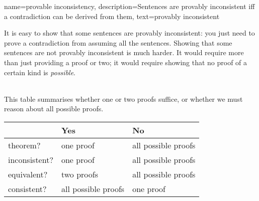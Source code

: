 {    name={provable inconsistency},
  description={Sentences are provably inconsistent iff a contradiction can be derived from them},
    text={provably inconsistent}
}

        It is easy to show that some sentences are provably inconsistent: you just need to prove a contradiction from assuming all the sentences. Showing that some sentences are not provably inconsistent is much harder. It would require more than just providing a proof or two; it would require showing that no proof of a certain kind is \emph{possible}.

\
\\
This table summarises whether one or two proofs suffice, or whether we must reason about all possible proofs.

\begin{center}
\begin{tabular}{l l l}
 & \textbf{Yes} & \textbf{No}\\
 \hline
theorem? & one proof & all possible proofs\\
inconsistent? &  one proof  & all possible proofs\\
equivalent? & two proofs & all possible proofs\\
consistent? & all possible proofs & one proof\\
\end{tabular}
\end{center}


